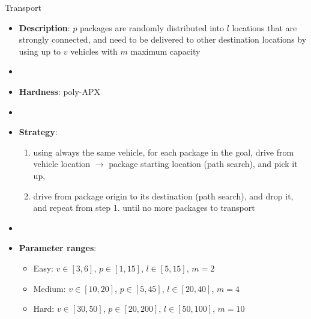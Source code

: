 \documentclass[aspectratio=169,xcolor=dvipsnames]{beamer}
\begin{document}
\begin{frame}{Transport}

    \begin{itemize}
        \item \textbf{Description}:  $p$ packages are randomly distributed into $l$ locations that are strongly connected, and need to be delivered to other destination locations  by using up to $v$ vehicles with $m$ maximum capacity
        \item[]
        \item \textbf{Hardness}: poly-APX %
        \item[]
        \item \textbf{Strategy}:
        \begin{enumerate}
            \item using always the same vehicle, for each package in the goal, drive from vehicle location $\rightarrow$ package starting location (path search), and pick it up,
            \item drive from package origin to its destination (path search), and drop it, and repeat from step 1. until no more packages to transport
        \end{enumerate}
        \item[] 
        \item \textbf{Parameter ranges}:
        \begin{itemize}
            \item Easy: $v\in[3, 6]$, $p\in[1, 15]$, $l\in[5, 15]$, $m=2$
            \item Medium: $v\in[10, 20]$, $p\in[5, 45]$, $l\in[20, 40]$, $m=4$
            \item Hard: $v\in[30, 50]$, $p\in[20, 200]$, $l\in[50, 100]$, $m=10$
        \end{itemize}
    \end{itemize}

\end{frame}
\end{document}
